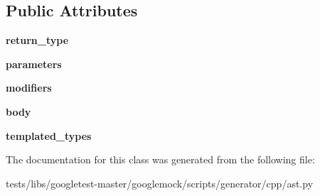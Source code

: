 \subsection*{Public Attributes}
\begin{DoxyCompactItemize}
\item 
\mbox{\label{classtests_1_1libs_1_1googletest-master_1_1googlemock_1_1scripts_1_1generator_1_1cpp_1_1ast_1_1Function_a210079cfeefbdbd5575a2c54df5312ae}} 
{\bfseries return\+\_\+type}
\item 
\mbox{\label{classtests_1_1libs_1_1googletest-master_1_1googlemock_1_1scripts_1_1generator_1_1cpp_1_1ast_1_1Function_af49c17be4106717feeebef5a641e6c06}} 
{\bfseries parameters}
\item 
\mbox{\label{classtests_1_1libs_1_1googletest-master_1_1googlemock_1_1scripts_1_1generator_1_1cpp_1_1ast_1_1Function_a81261b9745872c9519a66a16fd011a33}} 
{\bfseries modifiers}
\item 
\mbox{\label{classtests_1_1libs_1_1googletest-master_1_1googlemock_1_1scripts_1_1generator_1_1cpp_1_1ast_1_1Function_a9e29e1cbdf15e9aeac58d32f74a8ac8b}} 
{\bfseries body}
\item 
\mbox{\label{classtests_1_1libs_1_1googletest-master_1_1googlemock_1_1scripts_1_1generator_1_1cpp_1_1ast_1_1Function_add1e1a108888e7b1dc63bac3ace1a53e}} 
{\bfseries templated\+\_\+types}
\end{DoxyCompactItemize}


The documentation for this class was generated from the following file\+:\begin{DoxyCompactItemize}
\item 
tests/libs/googletest-\/master/googlemock/scripts/generator/cpp/ast.\+py\end{DoxyCompactItemize}
